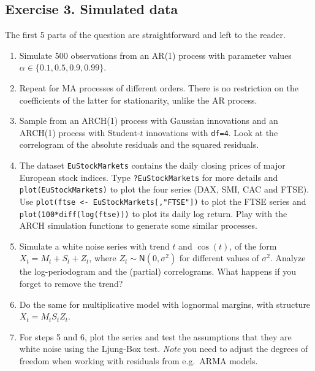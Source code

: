 \documentclass[]{book}
\providecommand{\tightlist}{%
  \setlength{\itemsep}{0pt}\setlength{\parskip}{0pt}}
\begin{document}
\subsection{Exercise 3. Simulated
data}\label{exercise-3.-simulated-data-1}

The first 5 parts of the question are straightforward and left to the
reader.

\begin{enumerate}
\def\labelenumi{\arabic{enumi}.}
\tightlist
\item
  Simulate 500 observations from an AR(1) process with parameter values
  \(\alpha \in \{0.1, 0.5, 0.9, 0.99\}\).
\item
  Repeat for MA processes of different orders. There is no restriction
  on the coefficients of the latter for stationarity, unlike the AR
  process.
\item
  Sample from an ARCH(1) process with Gaussian innovations and an
  ARCH(1) process with Student-\(t\) innovations with \texttt{df=4}.
  Look at the correlogram of the absolute residuals and the squared
  residuals.
\item
  The dataset \texttt{EuStockMarkets} contains the daily closing prices
  of major European stock indices. Type \texttt{?EuStockMarkets} for
  more details and \texttt{plot(EuStockMarkets)} to plot the four series
  (DAX, SMI, CAC and FTSE). Use
  \texttt{plot(ftse\ \textless{}-\ EuStockMarkets{[},"FTSE"{]})} to plot
  the FTSE series and \texttt{plot(100*diff(log(ftse)))} to plot its
  daily log return. Play with the ARCH simulation functions to generate
  some similar processes.
\item
  Simulate a white noise series with trend \(t\) and \(\cos(t)\), of the
  form \(X_t=M_t+S_t+Z_t\), where \(Z_t \sim \mathsf{N}(0,\sigma^2)\)
  for different values of \(\sigma^2\). Analyze the log-periodogram and
  the (partial) correlograms. What happens if you forget to remove the
  trend?
\item
  Do the same for multiplicative model with lognormal margins, with
  structure \(X_t=M_tS_tZ_t\).
\item
  For steps 5 and 6, plot the series and test the assumptions that they
  are white noise using the Ljung-Box test. \emph{Note} you need to
  adjust the degrees of freedom when working with residuals from
  e.g.~ARMA models.
\end{enumerate}
\end{document}

